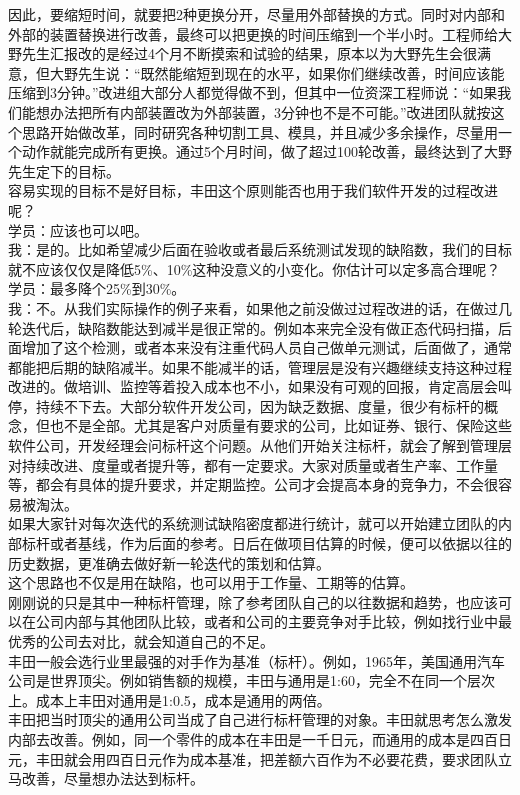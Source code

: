 因此，要缩短时间，就要把2种更换分开，尽量用外部替换的方式。同时对内部和外部的装置替换进行改善，最终可以把更换的时间压缩到一个半小时。工程师给大野先生汇报改的是经过4个月不断摸索和试验的结果，原本以为大野先生会很满意，但大野先生说：``既然能缩短到现在的水平，如果你们继续改善，时间应该能压缩到3分钟。''改进组大部分人都觉得做不到，但其中一位资深工程师说：``如果我们能想办法把所有内部装置改为外部装置，3分钟也不是不可能。''改进团队就按这个思路开始做改革，同时研究各种切割工具、模具，并且减少多余操作，尽量用一个动作就能完成所有更换。通过5个月时间，做了超过100轮改善，最终达到了大野先生定下的目标。\\
容易实现的目标不是好目标，丰田这个原则能否也用于我们软件开发的过程改进呢？\\
学员：应该也可以吧。\\
我：是的。比如希望减少后面在验收或者最后系统测试发现的缺陷数，我们的目标就不应该仅仅是降低5\%、10\%这种没意义的小变化。你估计可以定多高合理呢？\\
学员：最多降个25\%到30\%。\\
我：不。从我们实际操作的例子来看，如果他之前没做过过程改进的话，在做过几轮迭代后，缺陷数能达到减半是很正常的。例如本来完全没有做正态代码扫描，后面增加了这个检测，或者本来没有注重代码人员自己做单元测试，后面做了，通常都能把后期的缺陷减半。如果不能减半的话，管理层是没有兴趣继续支持这种过程改进的。做培训、监控等着投入成本也不小，如果没有可观的回报，肯定高层会叫停，持续不下去。大部分软件开发公司，因为缺乏数据、度量，很少有标杆的概念，但也不是全部。尤其是客户对质量有要求的公司，比如证券、银行、保险这些软件公司，开发经理会问标杆这个问题。从他们开始关注标杆，就会了解到管理层对持续改进、度量或者提升等，都有一定要求。大家对质量或者生产率、工作量等，都会有具体的提升要求，并定期监控。公司才会提高本身的竞争力，不会很容易被淘汰。\\
如果大家针对每次迭代的系统测试缺陷密度都进行统计，就可以开始建立团队的内部标杆或者基线，作为后面的参考。日后在做项目估算的时候，便可以依据以往的历史数据，更准确去做好新一轮迭代的策划和估算。\\
这个思路也不仅是用在缺陷，也可以用于工作量、工期等的估算。\\
刚刚说的只是其中一种标杆管理，除了参考团队自己的以往数据和趋势，也应该可以在公司内部与其他团队比较，或者和公司的主要竞争对手比较，例如找行业中最优秀的公司去对比，就会知道自己的不足。\\
丰田一般会选行业里最强的对手作为基准（标杆）。例如，1965年，美国通用汽车公司是世界顶尖。例如销售额的规模，丰田与通用是1:60，完全不在同一个层次上。成本上丰田对通用是1:0.5，成本是通用的两倍。\\
丰田把当时顶尖的通用公司当成了自己进行标杆管理的对象。丰田就思考怎么激发内部去改善。例如，同一个零件的成本在丰田是一千日元，而通用的成本是四百日元，丰田就会用四百日元作为成本基准，把差额六百作为不必要花费，要求团队立马改善，尽量想办法达到标杆。\\

